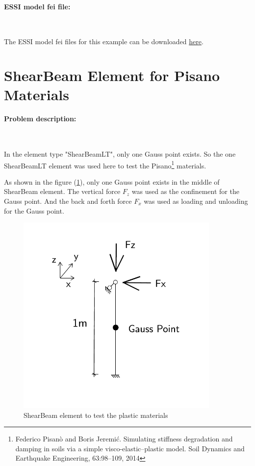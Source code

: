 \documentclass[fleqn,11pt]{article}
\begin{document}
\paragraph{ESSI model fei file: } ~



The ESSI model fei files for this example can be downloaded \href{https://github.com/yuan-energy/Real-ESSI-Examples/blob/master/model_fei_file/beam_elastic_presentation_example/beam_elastic_presentation_example.tgz?raw=true}{here}.














\newpage
\section{ShearBeam Element for Pisano Materials}

\paragraph{Problem description:} ~

In the element type "ShearBeamLT", only one Gauss point exists. So the one ShearBeamLT element was used here to test the Pisano\footnote{Federico Pisanò and Boris Jeremić. Simulating stiffness degradation and damping in soils via a simple
visco-elastic–plastic model. Soil Dynamics and Earthquake Engineering, 63:98–109, 2014} materials. 

As shown in the figure (\ref{fig ShearBeam element to test the plastic materials}), only one Gauss point exists in the middle of ShearBeam element. The vertical force $F_z$ was used as the confinement for the Gauss point. And the back and forth force $F_x$ was used as loading and unloading for the Gauss point. 

\begin{figure}[H]
  \centering
  \includegraphics[width=10cm]{../Figure-files/pisano_descrip.pdf}
  \caption{ShearBeam element to test the plastic materials}
  \label{fig ShearBeam element to test the plastic materials}
\end{figure}
\end{document}
